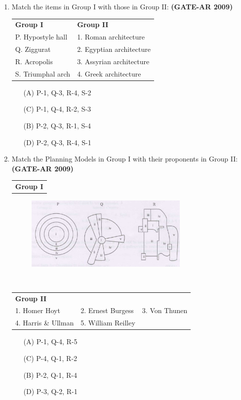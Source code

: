 \documentclass[a4paper,10pt]{article}
\begin{document}
\begin{enumerate}
    \item Match the items in Group I with those in Group II: \textbf{(GATE-AR 2009)} \\
    \begin{tabular}{ l l }
	\textbf{Group I} & \textbf{Group II} \\
	P. Hypostyle hall & 1. Roman architecture \\
	Q. Ziggurat & 2. Egyptian architecture \\
	R. Acropolis & 3. Assyrian architecture \\
	S. Triumphal arch & 4. Greek architecture \\
	\end{tabular}
	\begin{multicols}{2}
	\begin{itemize}
        \item[(A)] P-1, Q-3, R-4, S-2
        \item[(C)] P-1, Q-4, R-2, S-3
        \item[(B)] P-2, Q-3, R-1, S-4
        \item[(D)] P-2, Q-3, R-4, S-1
    \end{itemize}
	\end{multicols}

\newpage

    \item Match the Planning Models in Group I with their proponents in Group II: \textbf{(GATE-AR 2009)} \\
    \begin{tabular}{ l }
	\textbf{Group I} \\
	\end{tabular}
	\begin{figure}[h!]
        \centering
        \includegraphics[width=0.75\textwidth]{Pic03.jpg}
	\end{figure} \\
	\begin{tabular}{ l l l }
	\textbf{Group II} & & \\
	1. Homer Hoyt & 2. Ernest Burgess & 3. Von Thunen \\
	4. Harris \& Ullman & 5. William Reilley & \\
	\end{tabular}
	\begin{multicols}{2}
	\begin{itemize}
        \item[(A)] P-1, Q-4, R-5
        \item[(C)] P-4, Q-1, R-2
        \item[(B)] P-2, Q-1, R-4
        \item[(D)] P-3, Q-2, R-1
    \end{itemize}
	\end{multicols}


\end{enumerate}
\end{document}
